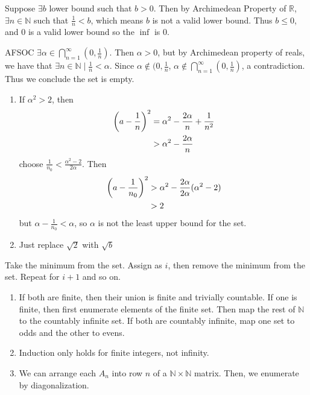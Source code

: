 \begin{exercise}
	Suppose $\exists b$ lower bound such that $b > 0$. Then by Archimedean Property of $\mathbb{R}$, $\exists n \in \mathbb{N}$ such that $\frac{1}{n} < b$, which means $b$ is not a valid lower bound. Thus $b \leq 0$, and 0 is a valid lower bound so the $\inf$ is 0.
\end{exercise}

\begin{exercise}
AFSOC $\exists \alpha \in \bigcap_{n=1}^\infty (0, \frac{1}{n})$. Then $\alpha >0$, but by Archimedean property of reals, we have that $\exists n \in \mathbb{N} \mid \frac{1}{n} < \alpha$. Since $\alpha \not\in (0, \frac{1}{n}$, $\alpha \not\in \bigcap_{n=1}^\infty (0, \frac{1}{n})$, a contradiction. Thus we conclude the set is empty.
\end{exercise}

\begin{exercise}
\begin{enumerate}[label=(\alph*)]
	\item If $\alpha^2 > 2$, then 
	\begin{align*}
		\left(a - \frac{1}{n}\right)^2 &= \alpha^2 - \frac{2\alpha}{n} + \frac{1}{n^2} \\
		&> \alpha^2 - \frac{2\alpha}{n}
	\end{align*}
	choose $\frac{1}{n_0} < \frac{\alpha^2 - 2}{2\alpha}$. Then
	\begin{align*}
		\left(a - \frac{1}{n_0}\right)^2 &> \alpha^2 - \frac{2\alpha}{2\alpha}(\alpha^2 - 2)\\
		&> 2
	\end{align*}
	but $\alpha - \frac{1}{n_0} < \alpha$, so $\alpha$ is not the least upper bound for the set.
	\item Just replace $\sqrt{2}$ with $\sqrt{b}$
\end{enumerate}
\end{exercise}

\begin{exercise}
	Take the minimum from the set. Assign as $i$, then remove the minimum from the set. Repeat for $i+1$ and so on.
\end{exercise}

\begin{exercise}
\begin{enumerate}[label=(\alph*)]
	\item If both are finite, then their union is finite and trivially countable. If one is finite, then first enumerate elements of the finite set. Then map the rest of $\mathbb{N}$ to the countably infinite set. If both are countably infinite, map one set to odds and the other to evens.
	\item Induction only holds for finite integers, not infinity.
	\item We can arrange each $A_n$ into row $n$ of a $\mathbb{N}\times \mathbb{N}$ matrix. Then, we enumerate by diagonalization.
\end{enumerate}
\end{exercise}

